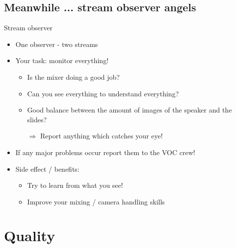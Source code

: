 \documentclass[hyperref={pdfpagelabels=false},aspectratio=169]{beamer}
\begin{document}
\subsection{Meanwhile ... stream observer angels} %
\begin{frame}{Stream observer}
\begin{itemize}
\item One observer - two streams 
\item Your task: monitor everything!
	\begin{itemize}
	\item Is the mixer doing a good job?
	\item Can you see everything to understand everything?
	\item Good balance between the amount of images of the speaker and the slides?
	\item[$\Rightarrow$] Report anything which catches your eye!
	\end{itemize}
\item If any major problems occur report them to the VOC crew!
\item Side effect / benefits:
	\begin{itemize}
	\item Try to learn from what you see!
	\item Improve your mixing / camera handling skills
	\end{itemize}
\end{itemize} 
\end{frame}


\section{Quality}  %
\end{document}
